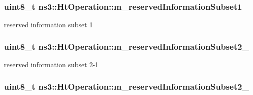 \subsubsection[{\texorpdfstring{m\+\_\+reserved\+Information\+Subset1}{m_reservedInformationSubset1}}]{\setlength{\rightskip}{0pt plus 5cm}uint8\+\_\+t ns3\+::\+Ht\+Operation\+::m\+\_\+reserved\+Information\+Subset1\hspace{0.3cm}{\ttfamily [private]}}\hypertarget{classns3_1_1HtOperation_a160865d81990b042b21177784683d90c}{}\label{classns3_1_1HtOperation_a160865d81990b042b21177784683d90c}


reserved information subset 1 

\subsubsection[{\texorpdfstring{m\+\_\+reserved\+Information\+Subset2\+\_\+1}{m_reservedInformationSubset2_1}}]{\setlength{\rightskip}{0pt plus 5cm}uint8\+\_\+t ns3\+::\+Ht\+Operation\+::m\+\_\+reserved\+Information\+Subset2\+\_\hspace{0.3cm}{\ttfamily [private]}}\hypertarget{classns3_1_1HtOperation_a92e7e8f82c294a90a405ef8ad2878e51}{}\label{classns3_1_1HtOperation_a92e7e8f82c294a90a405ef8ad2878e51}


reserved information subset 2-\/1 

\subsubsection[{\texorpdfstring{m\+\_\+reserved\+Information\+Subset2\+\_\+2}{m_reservedInformationSubset2_2}}]{\setlength{\rightskip}{0pt plus 5cm}uint8\+\_\+t ns3\+::\+Ht\+Operation\+::m\+\_\+reserved\+Information\+Subset2\+\_\hspace{0.3cm}{\ttfamily [private]}}\hypertarget{classns3_1_1HtOperation_ab809c53abe9b43680e10e0d1ad1be868}{}\label{classns3_1_1HtOperation_ab809c53abe9b43680e10e0d1ad1be868}


